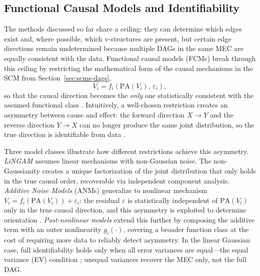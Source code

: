 \subsection*{Functional Causal Models and Identifiability}\label{sec:fcm-identifiability}
The methods discussed so far share a ceiling: they can determine which edges exist and, where possible, which v-structures are present, but certain edge directions remain undetermined because multiple DAGs in the same MEC are equally consistent with the data.
Functional causal models (FCMs) break through this ceiling by restricting the mathematical form of the causal mechanisms in the SCM from Section~\ref{sec:scms-dags},
\begin{equation}
    V_i = f_i\!\left(\mathrm{PA}(V_i),\, \varepsilon_i\right),
    \label{eq:scm-recall}
\end{equation}
so that the causal direction becomes the \emph{only} one statistically consistent with the assumed functional class \cite{Peters2017ElementsOC}.
Intuitively, a well-chosen restriction creates an asymmetry between cause and effect: the forward direction $X \to Y$ and the reverse direction $Y \to X$ can no longer produce the same joint distribution, so the true direction is identifiable from data \cite{Peters2017ElementsOC}.

Three model classes illustrate how different restrictions achieve this asymmetry.
\emph{LiNGAM} \cite{Shimizu2006ALN} assumes linear mechanisms with non-Gaussian noise.
The non-Gaussianity creates a unique factorization of the joint distribution that only holds in the true causal order, recoverable via independent component analysis.
\emph{Additive Noise Models} (ANMs) \cite{Hoyer2008NonlinearCD} generalize to nonlinear mechanism $V_i = f_i(\mathrm{PA}(V_i))+\varepsilon_i$: the residual $\varepsilon$ is statistically independent of $\mathrm{PA}(V_i)$ only in the true causal direction, and this asymmetry is exploited to determine orientation \cite{Hoyer2008NonlinearCD, Peters2017ElementsOC}.
\emph{Post-nonlinear models} \cite{Zhang2009OnTI} extend this further by composing the additive term with an outer nonlinearity $g_i(\cdot)$, covering a broader function class at the cost of requiring more data to reliably detect asymmetry.
In the linear Gaussian case, full identifiability holds only when all error variances are equal---the equal variance (EV) condition \cite{Peters2012IdentifiabilityOG}; unequal variances recover the MEC only, not the full DAG.

